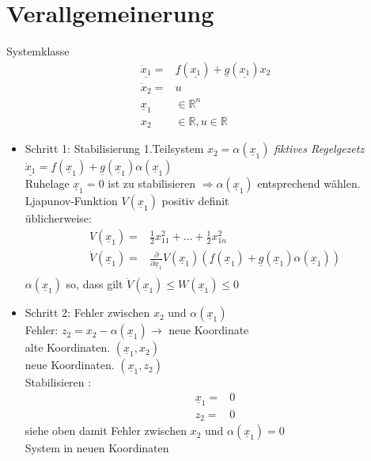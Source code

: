 \documentclass[ngerman]{tudscrreprt}
\begin{document}
\section{Verallgemeinerung}
Systemklasse
\begin{align*}
\underline{\dot x_1} = & \underline{f}(\underline{x_1}) + \underline{g}(\underline{x_1})x_2\\
\dot x_2 = & u\\
\underline x_1 &\in \mathbb{R}^n\\
x_2 &\in \mathbb{R}, u \in \mathbb{R}
\end{align*}
\begin{itemize}
\item Schritt 1: Stabilisierung 1.Teilsystem $x_2 = \alpha(\underline x_1)$ \textit{ fiktives Regelgezetz }\\ $\underline {\dot x_1} = \underline f (\underline x_1) + \underline g(\underline x_1) \alpha (\underline x_1)$ \\
Ruhelage $\underline x_1 = 0 $ ist zu stabilisieren $\Rightarrow \alpha(\underline x_1)$ entsprechend wählen. \\
Ljapunov-Funktion $V(\underline x_1) $ positiv definit \\
üblicherweise: 
\begin{align*}
V(\underline x_1) = &\frac{1}{2} x_{11}^2 + \dots + \frac{1}{2} x_{1n}^2\\
\dot V(\underline x_1) = & \frac{\partial}{\partial \underline x_1} V(\underline x_1) (\underline f(\underline x_1) + \underline g(\underline x_1) \alpha (\underline x_1))\\
\end{align*}
$\alpha(\underline x_1)$ so, dass gilt $\dot V(\underline x_1) \le W(\underline x_1) \le 0$
\item Schritt 2: Fehler zwischen $x_2$ und $\alpha (\underline x_1)$\\
Fehler: $z_2 = x_2 - \alpha (\underline x_1) \rightarrow$ neue Koordinate\\
alte Koordinaten. $(\underline x_1, x_2)$\\
neue Koordinaten. $(\underline x_1, z_2)$\\
Stabilisieren : 
\begin{align*}
\underline x_1 = &0 \\
z_2 = &0
\end{align*} siehe oben damit Fehler zwischen $x_2$ und $\alpha(\underline x_1) = 0$\\
System in neuen Koordinaten\\

\end{itemize}
\end{document}
